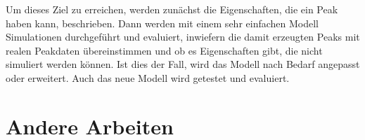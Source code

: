 


Um dieses Ziel zu erreichen, werden zunächst die Eigenschaften, die ein Peak haben kann, beschrieben. Dann werden mit einem sehr einfachen Modell Simulationen durchgeführt und evaluiert, inwiefern die damit erzeugten Peaks mit realen Peakdaten übereinstimmen und ob es Eigenschaften gibt, die nicht simuliert werden können. Ist dies der Fall, wird das Modell nach Bedarf angepasst oder erweitert. Auch das neue Modell wird getestet und evaluiert. 

% 


\section{Andere Arbeiten}
\label{chapter:ein_andere}

